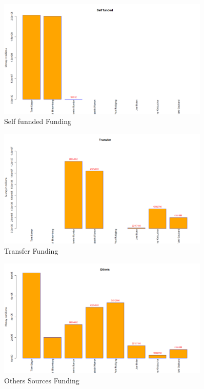 \begin{figure}[H]
    \centering
    \includegraphics[width=0.9\textwidth]{figures/Selffunnded.png}
    \caption{Self funnded Funding}
    \label{Selffunnded}
\end{figure}

\begin{figure}[H]
    \centering
    \includegraphics[width=0.9\textwidth]{figures/Transfer.png}
    \caption{Transfer Funding}
    \label{Transfer}
\end{figure}

\begin{figure}[H]
    \centering
    \includegraphics[width=0.9\textwidth]{figures/Others.png}
    \caption{Others Sources Funding}
    \label{Others}
\end{figure}
